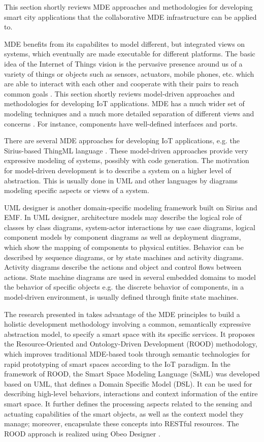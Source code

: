 This section shortly reviews MDE approaches and methodologies for developing smart city applications that the collaborative MDE infrastructure can be applied to.

MDE benefits from its capabilites to model different, but integrated views on systems, which eventually  are made executable for different platforms. The basic idea of the Internet of Things vision is the pervasive presence around us of a variety of things or objects such as sensors, actuators, mobile phones, etc. which are able to interact with each other and cooperate with their pairs to reach common goals \citep{Atzori+2010, Giusto+2010}. This section shortly reviews model-driven approaches and methodologies for developing IoT applications. MDE has a much wider set of modeling techniques and a much more detailed separation of different views and concerns \citep{KateuleWinter2018}. For instance, components have well-defined interfaces and ports.

There are several MDE approaches for developing IoT applications, e.g. the Sirius-based ThingML language \cite{Fleurey+2011}. These model-driven approaches provide very expressive modeling of systems, possibly with code generation. The motivation for model-driven development is to describe a system on a higher level of abstraction. This is usually done in UML and other languages by diagrams modeling specific aspects or views of a system.

UML designer \cite{umlDesigner} is another domain-specific modeling framework built on Sirius and EMF. In UML designer, architecture models may describe the logical role of classes by class diagrams, system-actor interactions by use case diagrams, logical component models by component diagrams as well as deployment diagrams, which show the mapping of components to physical entities. Behavior can be described by sequence diagrams, or by state machines and activity diagrams. Activity diagrams describe the actions and object and control flows between actions. State machine diagrams are used in several embedded domains to model the behavior of specific objects e.g. the discrete behavior of components, in a model-driven environment, is usually defined through finite state machines. 

The research presented in \cite{Corredor+2012} takes advantage of the MDE principles to build a holistic development methodology involving a common, semantically expressive abstraction model, to specify a smart space with its specific services. It proposes the Resource-Oriented and Ontology-Driven Development (ROOD) methodology, which improves traditional MDE-based tools through semantic technologies for rapid prototyping of smart spaces according to the IoT paradigm. In the framework of ROOD, the Smart Space Modeling Language (SsML) was developed based on UML, that defines a Domain Specific Model (DSL). It can be used for describing high-level behaviors, interactions and context information of the entire smart space. It further defines the processing aspects related to the sensing and actuating capabilities of the smart objects, as well as the context model they manage; moreover, encapsulate these concepts into RESTful resources. The ROOD approach is realized using Obeo Designer \cite{Designer2016}.